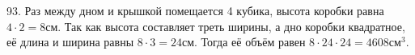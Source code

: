93. Раз между дном и крышкой помещается 4 кубика, высота коробки равна $4\cdot2=8$см. Так как высота составляет треть ширины, а дно коробки квадратное, её длина и ширина равны $8\cdot3=24$см. Тогда её объём равен $8\cdot24\cdot24=4608\text{см}^3.$\\
